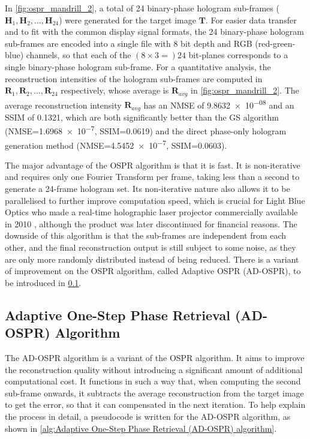 In \cref{fig:ospr_mandrill_2}, a total of 24 binary-phase hologram sub-frames ($\textbf{H}_1, \textbf{H}_2, \ldots, \textbf{H}_{24}$) were generated for the target image $\textbf{T}$. For easier data transfer and to fit with the common display signal formats, the 24 binary-phase hologram sub-frames are encoded into a single file with 8 bit depth and RGB (red-green-blue) channels, so that each of the $(8\times 3 = )24$ bit-planes corresponds to a single binary-phase hologram sub-frame. For a quantitative analysis, the reconstruction intensities of the hologram sub-frames are computed in $\textbf{R}_1, \textbf{R}_2, \ldots, \textbf{R}_{24}$ respectively, whose average is $\textbf{R}_{avg}$ in \cref{fig:ospr_mandrill_2}. The average reconstruction intensity $\textbf{R}_{avg}$ has an NMSE of \num{9.8632e-08} and an SSIM of 0.1321, which are both significantly better than the GS algorithm (NMSE=\num{1.6968e-7}, SSIM=0.0619) and the direct phase-only hologram generation method (NMSE=\num{4.5452e-7}, SSIM=0.0603).

The major advantage of the OSPR algorithm is that it is fast. It is non-iterative and requires only one Fourier Transform per frame, taking less than a second to generate a 24-frame hologram set. Its non-iterative nature also allows it to be parallelised to further improve computation speed, which is crucial for Light Blue Optics who made a real-time holographic laser projector commercially available in 2010 \cite{Buckley2008}, although the product was later discontinued for financial reasons. The downside of this algorithm is that the sub-frames are independent from each other, and the final reconstruction output is still subject to some noise, as they are only more randomly distributed instead of being reduced. There is a variant of improvement on the OSPR algorithm, called Adaptive OSPR (AD-OSPR), to be introduced in \cref{sec:Adaptive One-Step Phase Retrieval (AD-OSPR) Algorithm}.



\subsection{Adaptive One-Step Phase Retrieval (AD-OSPR) Algorithm}\label{sec:Adaptive One-Step Phase Retrieval (AD-OSPR) Algorithm}

The AD-OSPR algorithm \cite{Kaczorowski2016} is a variant of the OSPR algorithm. It aims to improve the reconstruction quality without introducing a significant amount of additional computational cost. It functions in such a way that, when computing the second sub-frame onwards, it subtracts the average reconstruction from the target image to get the error, so that it can compensated in the next iteration. To help explain the process in detail, a pseudocode is written for the AD-OSPR algorithm, as shown in \cref{alg:Adaptive One-Step Phase Retrieval (AD-OSPR) algorithm}.

